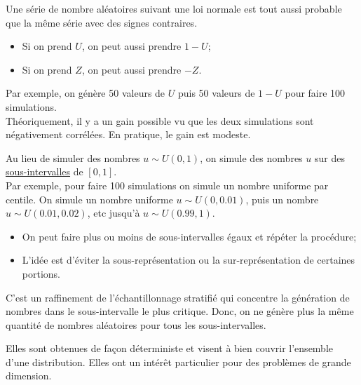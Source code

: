 \documentclass[10pt, french]{article}
\begin{document}
\begin{multicols*}{2}
\begin{definitionNOHFILLsub}
Une série de nombre aléatoires suivant une loi normale est tout aussi probable que la même série avec des signes contraires.
\begin{itemize}
	\item	Si on prend $U$, on peut aussi prendre $1 - U$;
	\item	Si on prend $Z$, on peut aussi prendre $-Z$.
\end{itemize}

Par exemple, on génère 50 valeurs de $U$ puis 50 valeurs de $1	-	U$ pour faire 100 simulations.
\\

Théoriquement, il y a un gain possible vu que les deux simulations sont négativement corrélées. En pratique, le gain est modeste.
\end{definitionNOHFILLsub}

\begin{definitionNOHFILLsub}
Au lieu de simuler des nombres $u \sim U(0, 1)$, on simule des nombres $u$ sur des \underline{sous-intervalles} de $[0, 1]$.\\

Par exemple, pour faire 100 simulations on simule un nombre uniforme par centile. On simule un nombre uniforme $u \sim U(0, 0.01)$, puis un nombre $u \sim U(0.01, 0.02)$, etc jusqu'à $u \sim U(0.99, 1)$.\\

\begin{itemize}
	\item	On peut faire plus ou moins de sous-intervalles égaux et répéter la procédure;
	\item	L'idée est d'éviter la sous-représentation ou la sur-représentation de certaines portions.
\end{itemize}

\begin{definitionNOHFILLsub}
C'est un raffinement de l'échantillonnage stratifié qui concentre la génération de nombres dans le sous-intervalle le plus critique. Donc, on ne génère plus la même quantité de nombres aléatoires pour tous les sous-intervalles.
\end{definitionNOHFILLsub}
\end{definitionNOHFILLsub}

\begin{definitionNOHFILLsub}
Elles sont obtenues de façon déterministe et visent à bien couvrir l'ensemble d'une distribution. Elles ont un intérêt particulier pour des problèmes de grande dimension.
\end{definitionNOHFILLsub}



\end{multicols*}
\end{document}
